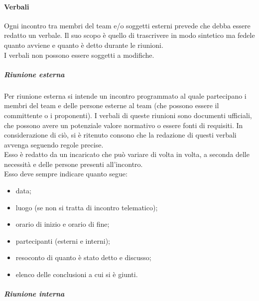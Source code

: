 			\paragraph{Verbali}
				Ogni incontro tra membri del team e/o soggetti esterni prevede che debba essere redatto un verbale. Il suo scopo è quello di trascrivere in modo sintetico ma fedele quanto avviene e quanto è detto durante le riunioni.\\
				I verbali non possono essere soggetti a modifiche.
				\subparagraph{Riunione esterna}
					Per riunione esterna si intende un incontro programmato al quale partecipano i membri del team e delle persone esterne al team (che possono essere il committente o i proponenti). I verbali di queste riunioni sono documenti ufficiali, che possono avere un potenziale valore normativo o essere fonti di requisiti. In considerazione di ciò, si è ritenuto consono che la redazione di questi verbali avvenga seguendo regole precise.\\
					Esso è redatto da un incaricato che può variare di volta in volta, a seconda delle necessità e delle persone presenti all’incontro.\\
					Esso deve sempre indicare quanto segue:
					\begin{itemize}
						\item data;
						\item luogo (se non si tratta di incontro telematico);
						\item orario di inizio e orario di fine;
						\item partecipanti (esterni e interni);
						\item resoconto di quanto è stato detto e discusso;
						\item elenco delle conclusioni a cui si è giunti.
					\end{itemize}
				\subparagraph{Riunione interna}

